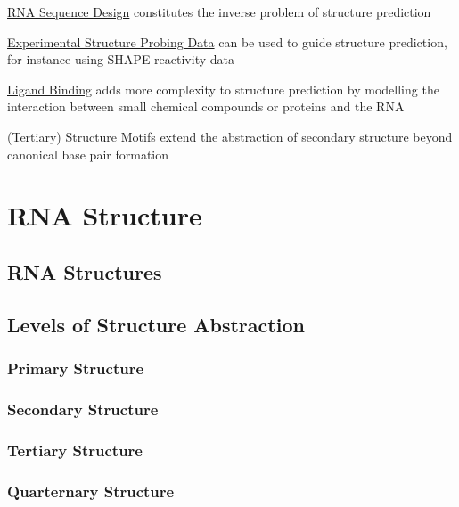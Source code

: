 \begin{DoxyItemize}
\item \hyperlink{design}{R\+NA Sequence Design} constitutes the inverse problem of structure prediction
\item \hyperlink{structure_probing_data}{Experimental Structure Probing Data} can be used to guide structure prediction, for instance using S\+H\+A\+PE reactivity data
\item \hyperlink{ligand_binding}{Ligand Binding} adds more complexity to structure prediction by modelling the interaction between small chemical compounds or proteins and the R\+NA
\item \hyperlink{structure_motifs}{(Tertiary) Structure Motifs} extend the abstraction of secondary structure beyond canonical base pair formation 
\end{DoxyItemize}\hypertarget{secondary_structures}{}\section{R\+NA Structure}\label{secondary_structures}
\hypertarget{secondary_structures_structures}{}\subsection{R\+N\+A Structures}\label{secondary_structures_structures}
\hypertarget{secondary_structures_structure_abstraction}{}\subsection{Levels of Structure Abstraction}\label{secondary_structures_structure_abstraction}
\hypertarget{secondary_structures_abstraction_primary}{}\subsubsection{Primary Structure}\label{secondary_structures_abstraction_primary}
\hypertarget{secondary_structures_abstraction_secondary}{}\subsubsection{Secondary Structure}\label{secondary_structures_abstraction_secondary}
\hypertarget{secondary_structures_abstraction_tertiary}{}\subsubsection{Tertiary Structure}\label{secondary_structures_abstraction_tertiary}
\hypertarget{secondary_structures_abstraction_quarternary}{}\subsubsection{Quarternary Structure}\label{secondary_structures_abstraction_quarternary}
